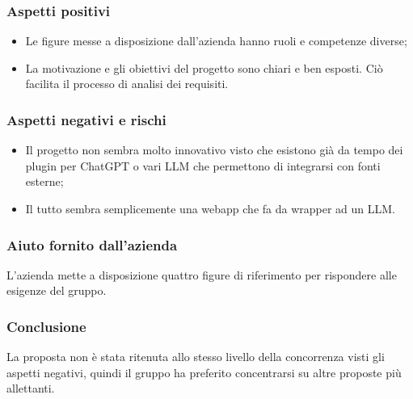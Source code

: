 \documentclass[10pt]{article}
\begin{document}
\subsubsection{Aspetti positivi}
\begin{itemize}
    \item Le figure messe a disposizione dall’azienda hanno ruoli e competenze diverse;
    \item La motivazione e gli obiettivi del progetto sono chiari e ben esposti. Ciò facilita il processo di analisi dei requisiti.
\end{itemize}
\subsubsection{Aspetti negativi e rischi}
\begin{itemize}
    \item Il progetto non sembra molto innovativo visto che esistono già da tempo dei plugin per ChatGPT o vari LLM che permettono di integrarsi con fonti esterne;
    \item Il tutto sembra semplicemente una webapp che fa da wrapper ad un LLM.
\end{itemize}
\subsubsection{Aiuto fornito dall'azienda}
L’azienda mette a disposizione quattro figure di riferimento per rispondere alle esigenze del gruppo.
\subsubsection{Conclusione}
La proposta non è stata ritenuta allo stesso livello della concorrenza visti gli aspetti negativi, quindi il gruppo ha preferito concentrarsi su altre proposte più allettanti.
\\\\
\end{document}
